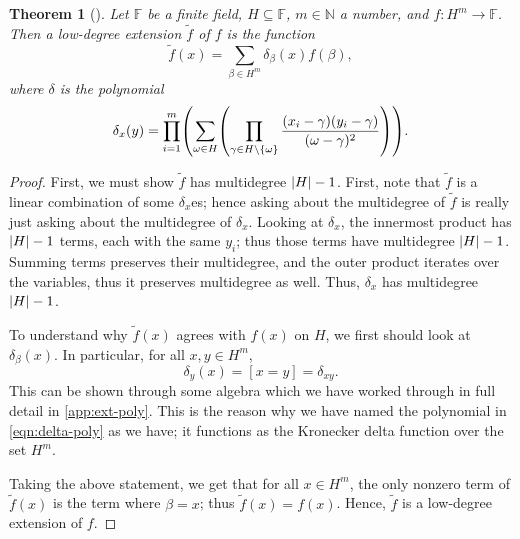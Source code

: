 \documentclass[english,12pt]{reedthesis}
\theoremstyle{plain}
\newtheorem{thm}{Theorem}[section]
\theoremstyle{definition}
\theoremstyle{remark}
\DeclarePairedDelimiter{\abs}{\lvert}{\rvert}
\begin{document}
\begin{thm}[{\cite[]{CFGS22}}]\label{thm:low-deg-ext-exists}
  Let $\mathbb{F}$ be a finite field, $H \subseteq \mathbb{F}$, $m \in \mathbb{N}$ a number, and
  $f\colon H^{m} \rightarrow \mathbb{F}$. Then a low-degree extension $\tilde{f}$ of $f$
  is the function
  \begin{equation}
    \tilde{f}(x) = \sum_{\beta \in H^{m}}\delta_{\beta}(x)f(\beta),
  \end{equation}
  where $\delta$ is the polynomial
  \begin{equation}\label{eqn:delta-poly}
    \delta_{x}(y) = \prod_{i = 1}^{m}\mleft(\sum_{\omega \in H}\mleft(
        \prod_{\gamma \in H \setminus \{\omega\}}\frac{(x_{i} - \gamma)(y_{i} - \gamma)}{(\omega - \gamma)^{2}}
      \mright)\mright).
  \end{equation}
\end{thm}

\begin{proof}
  First, we must show $\tilde{f}$ has multidegree $\abs{H} - 1$. First, note
  that $\tilde{f}$ is a linear combination of some $\delta_{x}$es; hence asking about
  the multidegree of $\tilde{f}$ is really just asking about the multidegree of
  $\delta_{x}$. Looking at $\delta_{x}$, the innermost product has $\abs{H} - 1$ terms,
  each with the same $y_{i}$; thus those terms have multidegree $\abs{H} - 1$.
  Summing terms preserves their multidegree, and the outer product iterates over
  the variables, thus it preserves multidegree as well. Thus, $\delta_{x}$ has
  multidegree $\abs{H} - 1$.

  To understand why $\tilde{f}(x)$ agrees with $f(x)$ on $H$, we first should
  look at $\delta_{\beta}(x)$. In particular, for all $x, y \in H^{m}$,
  \begin{equation}\label{eqn:delta-is-delta}
    \delta_{y}(x) = [x = y] = \delta_{xy}.
  \end{equation}
  This can be shown through some algebra which we have worked through in full
  detail in \cref{app:ext-poly}. This is the reason why we have named the
  polynomial in \cref{eqn:delta-poly} as we have; it functions as the Kronecker
  delta function over the set $H^{m}$.

  Taking the above statement, we get that for all $x \in H^{m}$, the only nonzero
  term of $\tilde{f}(x)$ is the term where $\beta = x$; thus $\tilde{f}(x) = f(x)$.
  Hence, $\tilde{f}$ is a low-degree extension of $f$.
\end{proof}
\end{document}
